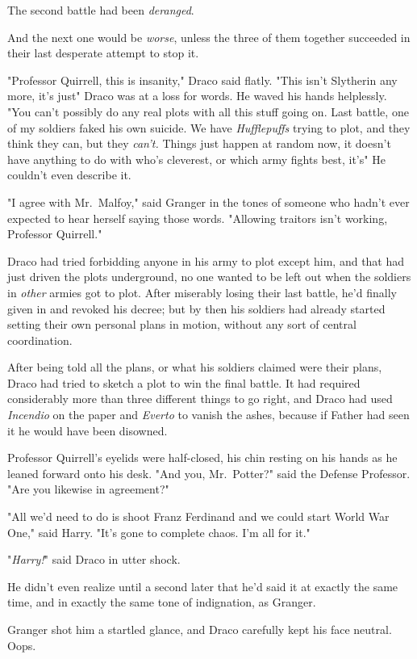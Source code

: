 The second battle had been \emph{deranged}.

And the next one would be \emph{worse}, unless the three of them together
succeeded in their last desperate attempt to stop it.

"Professor Quirrell, this is insanity," Draco said flatly. "This isn't
Slytherin any more, it's just{\el}" Draco was at a loss for words. He
waved his hands helplessly. "You can't possibly do any real plots with all this
stuff going on. Last battle, one of my soldiers faked his own suicide. We have
\emph{Hufflepuffs} trying to plot, and they think they can, but they
\emph{can't.} Things just happen at random now, it doesn't have anything to do
with who's cleverest, or which army fights best, it's{\el}" He couldn't even
describe it.

"I agree with Mr.~Malfoy," said Granger in the tones of someone who hadn't ever
expected to hear herself saying those words. "Allowing traitors isn't working,
Professor Quirrell."

Draco had tried forbidding anyone in his army to plot except him, and that had
just driven the plots underground, no one wanted to be left out when the
soldiers in \emph{other} armies got to plot. After miserably losing their last
battle, he'd finally given in and revoked his decree; but by then his soldiers
had already started setting their own personal plans in motion, without any
sort of central coordination.

After being told all the plans, or what his soldiers claimed were their plans,
Draco had tried to sketch a plot to win the final battle. It had required
considerably more than three different things to go right, and Draco had used
\emph{Incendio} on the paper and \emph{Everto} to vanish the ashes, because if
Father had seen it he would have been disowned.

Professor Quirrell's eyelids were half-closed, his chin resting on his hands as
he leaned forward onto his desk. "And you, Mr.~Potter?" said the Defense
Professor. "Are you likewise in agreement?"

"All we'd need to do is shoot Franz Ferdinand and we could start World War
One," said Harry. "It's gone to complete chaos. I'm all for it."

"\emph{Harry!}" said Draco in utter shock.

He didn't even realize until a second later that he'd said it at exactly the
same time, and in exactly the same tone of indignation, as Granger.

Granger shot him a startled glance, and Draco carefully kept his face neutral.
Oops.


